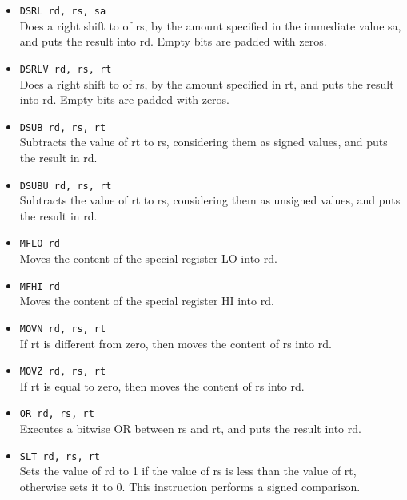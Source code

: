 \documentclass[12pt]{report}
\begin{document}
\begin{itemize}
	\item \texttt{DSRL rd, rs, sa}\\
	Does a right shift to of rs, by the amount specified in the immediate value
	sa, and puts the result into rd. Empty bits are padded with zeros.
	
	\item \texttt{DSRLV rd, rs, rt}\\
	Does a right shift to of rs, by the amount specified in rt, and puts the
	result into rd. Empty bits are padded with zeros.

	\item \texttt{DSUB rd, rs, rt}\\
	Subtracts the value of rt to rs, considering them as signed values, and
	puts the result in rd.

	\item \texttt{DSUBU rd, rs, rt}\\
	Subtracts the value of rt to rs, considering them as unsigned values, and
	puts the result in rd.

	\item \texttt{MFLO rd}\\
	Moves the content of the special register LO into rd.

	\item \texttt{MFHI rd}\\
	Moves the content of the special register HI into rd.

	\item \texttt{MOVN rd, rs, rt}\\
	If rt is different from zero, then moves the content of rs into rd.

	\item \texttt{MOVZ rd, rs, rt}\\
	If rt is equal to zero, then moves the content of rs into rd.

	\item \texttt{OR rd, rs, rt}\\
	Executes a bitwise OR between rs and rt, and puts the result into rd.

	\item \texttt{SLT rd, rs, rt}\\
	Sets the value of rd to 1 if the value of rs is less than the value of rt,
	otherwise sets it to 0. This instruction performs a signed comparison.


\end{itemize}
\end{document}

